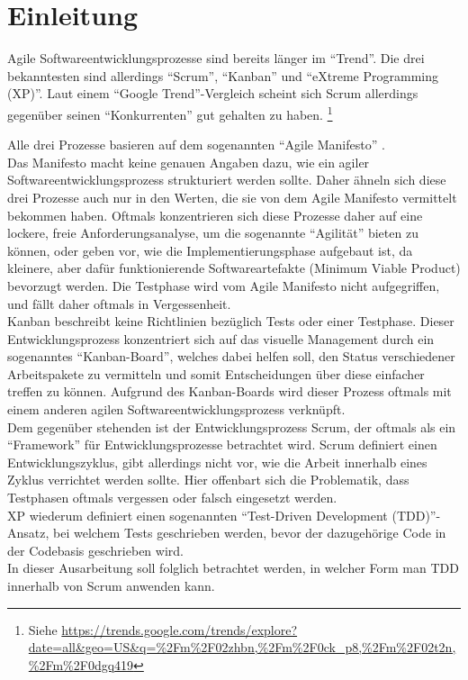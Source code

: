 \documentclass[12pt,DIV14,BCOR10mm,a4paper,twoside,parskip=half-,headsepline,headinclude,english,ngerman,bibliography=totocnumbered]{scrreprt}
\begin{document}
\tableofcontents  %

\chapter{Einleitung}

Agile Softwareentwicklungsprozesse sind bereits länger im \enquote{Trend}.
Die drei bekanntesten sind allerdings \enquote{Scrum}, \enquote{Kanban} und \enquote{eXtreme Programming (XP)}.
Laut einem \enquote{Google Trend}-Vergleich scheint sich Scrum allerdings gegenüber seinen \enquote{Konkurrenten} gut gehalten zu haben. \footnote{Siehe \url{https://trends.google.com/trends/explore?date=all\&geo=US\&q=\%2Fm\%2F02zhbn,\%2Fm\%2F0ck\_p8,\%2Fm\%2F02t2n,\%2Fm\%2F0dgq419}}

Alle drei Prozesse basieren auf dem sogenannten \enquote{Agile Manifesto} \autocite{AgileManifesto}. \\
Das Manifesto macht keine genauen Angaben dazu, wie ein agiler Softwareentwicklungsprozess strukturiert werden sollte.
Daher ähneln sich diese drei Prozesse auch nur in den Werten, die sie von dem Agile Manifesto vermittelt bekommen haben.
Oftmals konzentrieren sich diese Prozesse daher auf eine lockere, freie Anforderungsanalyse, um die sogenannte \enquote{Agilität} bieten zu können, oder geben vor, wie die Implementierungsphase aufgebaut ist, da kleinere, aber dafür funktionierende Softwareartefakte (Minimum Viable Product) bevorzugt werden.
Die Testphase wird vom Agile Manifesto nicht aufgegriffen, und fällt daher oftmals in Vergessenheit.  \\
Kanban beschreibt keine Richtlinien bezüglich Tests oder einer Testphase.
Dieser Entwicklungsprozess konzentriert sich auf das visuelle Management durch ein sogenanntes \enquote{Kanban-Board}, welches dabei helfen soll, den Status verschiedener Arbeitspakete zu vermitteln und somit Entscheidungen über diese einfacher treffen zu können.
Aufgrund des Kanban-Boards wird dieser Prozess oftmals mit einem anderen agilen Softwareentwicklungsprozess verknüpft.  \\
Dem gegenüber stehenden ist der Entwicklungsprozess Scrum, der oftmals als ein \enquote{Framework} für Entwicklungsprozesse betrachtet wird.
Scrum definiert einen Entwicklungszyklus, gibt allerdings nicht vor, wie die Arbeit innerhalb eines Zyklus verrichtet werden sollte.
Hier offenbart sich die Problematik, dass Testphasen oftmals vergessen oder falsch eingesetzt werden. \\
XP wiederum definiert einen sogenannten \enquote{Test-Driven Development (TDD)}-Ansatz, bei welchem Tests geschrieben werden, bevor der dazugehörige Code in der Codebasis geschrieben wird.  \\
In dieser Ausarbeitung soll folglich betrachtet werden, in welcher Form man TDD innerhalb von Scrum anwenden kann.
\end{document}
